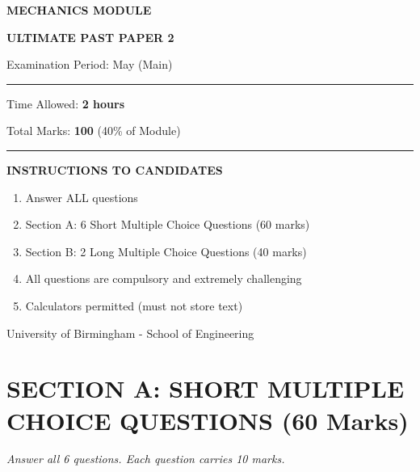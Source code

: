 \documentclass[12pt,a4paper]{article}
\begin{document}
\begin{titlepage}
    \centering
    \vspace*{2cm}
    {\Huge\bfseries\color{examblue}MECHANICS MODULE}\par
    \vspace{0.5cm}
    {\Large\bfseries ULTIMATE PAST PAPER 2}\par
    \vspace{1.5cm}
    {\large Examination Period: May (Main)}\par
    \vspace{0.5cm}
    \rule{\linewidth}{2pt}\par
    \vspace{1cm}
    {\Large Time Allowed: \textbf{2 hours}}\par
    \vspace{0.5cm}
    {\Large Total Marks: \textbf{100} (40\% of Module)}\par
    \vspace{1.5cm}
    \rule{\linewidth}{1pt}\par
    \vspace{1cm}
    {\large\bfseries INSTRUCTIONS TO CANDIDATES}\par
    \vspace{0.5cm}
    \begin{minipage}{0.8\linewidth}
        \begin{enumerate}[label=\textbf{\arabic*.},leftmargin=*]
            \item Answer ALL questions
            \item Section A: 6 Short Multiple Choice Questions (60 marks)
            \item Section B: 2 Long Multiple Choice Questions (40 marks)
            \item All questions are compulsory and extremely challenging
            \item Calculators permitted (must not store text)
        \end{enumerate}
    \end{minipage}
    \vfill
    {\small University of Birmingham - School of Engineering}\par
\end{titlepage}

\newpage
\section*{SECTION A: SHORT MULTIPLE CHOICE QUESTIONS (60 Marks)}
{\large\itshape Answer all 6 questions. Each question carries 10 marks.}
\end{document}
